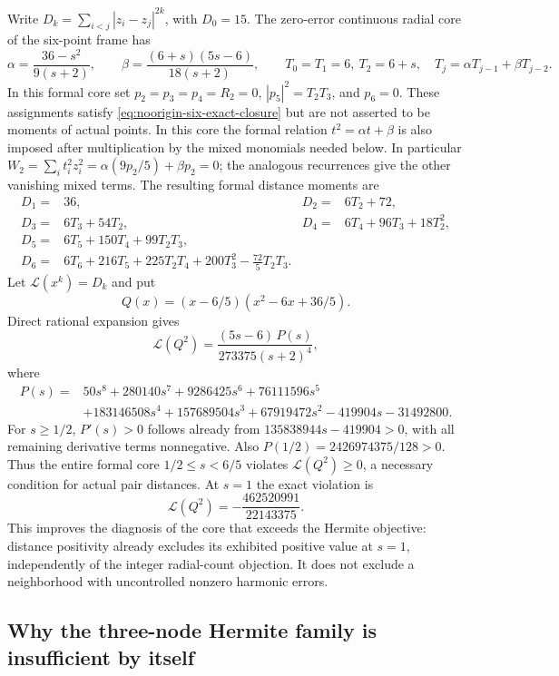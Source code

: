 \documentclass[11pt]{article}
\theoremstyle{remark}
\numberwithin{equation}{section}
\begin{document}
Write $D_k=\sum_{i<j}|z_i-z_j|^{2k}$, with $D_0=15$.
The zero-error continuous radial core of the six-point frame has
\[
 \alpha=\frac{36-s^2}{9(s+2)},\qquad
 \beta=\frac{(6+s)(5s-6)}{18(s+2)},\qquad
 T_0=T_1=6,\ T_2=6+s,\quad
 T_j=\alpha T_{j-1}+\beta T_{j-2}.
\]
In this formal core set $p_2=p_3=p_4=R_2=0$,
$|p_5|^2=T_2T_3$, and $p_6=0$. These assignments satisfy
\eqref{eq:noorigin-six-exact-closure} but are not asserted to be
moments of actual points. In this core the formal relation
$t^2=\alpha t+\beta$ is also imposed after multiplication by the
mixed monomials needed below. In particular
$W_2=\sum_i t_i^2z_i^2=\alpha(9p_2/5)+\beta p_2=0$;
the analogous recurrences give the other vanishing mixed terms.
The resulting formal distance moments are
\begin{align*}
 D_1={}&36,&D_2={}&6T_2+72,\\
 D_3={}&6T_3+54T_2,&D_4={}&6T_4+96T_3+18T_2^2,\\
 D_5={}&6T_5+150T_4+99T_2T_3,\\
 D_6={}&6T_6+216T_5+225T_2T_4+200T_3^2
                   -\frac{72}{5}T_2T_3.
\end{align*}
Let $\mathcal L(x^k)=D_k$ and put
\[
 Q(x)=(x-6/5)(x^2-6x+36/5).
\]
Direct rational expansion gives
\begin{equation}\label{eq:noorigin-six-core-hankel}
 \mathcal L(Q^2)=\frac{(5s-6)\,P(s)}{273375(s+2)^4},
\end{equation}
where
\begin{align*}
 P(s)={}&50s^8+280140s^7+9286425s^6+76111596s^5\\
       &+183146508s^4+157689504s^3+67919472s^2
         -419904s-31492800.
\end{align*}
For $s\ge1/2$, $P'(s)>0$ follows already from
$135838944s-419904>0$, with all remaining derivative terms
nonnegative. Also $P(1/2)=2426974375/128>0$.
Thus the entire formal core $1/2\le s<6/5$ violates
$\mathcal L(Q^2)\ge0$, a necessary condition for actual pair distances.
At $s=1$ the exact violation is
\[
                    \mathcal L(Q^2)=-\frac{462520991}{22143375}.
\]
This improves the diagnosis of the core that exceeds the Hermite
objective: distance positivity already excludes its exhibited positive
value at $s=1$,
independently of the integer radial-count objection. It does not
exclude a neighborhood with uncontrolled nonzero harmonic errors.

\subsection{Why the three-node Hermite family is insufficient by itself}
\end{document}
